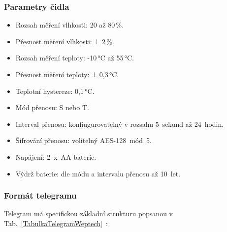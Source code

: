 \subsubsection{Parametry čidla}
\begin{itemize}
	\item Rozsah měření vlhkosti: 20 až 80\,\%.
	\item Přesnost měření vlhkosti: ± 2\,\%.
	\item Rozsah měření teploty: -10\,°C až 55\,°C.
	\item Přesnost měření teploty: ± 0,3\,°C.
	\item Teplotní hystereze: 0,1\,°C.
	\item Mód přenosu: S nebo T.
	\item Interval přenosu: konfiugurovatelný v rozsahu 5~sekund až 24~hodin.
	\item Šifrování přenosu: volitelný AES-128~mód~5.
	\item Napájení: 2~x~AA baterie.
	\item Výdrž baterie: dle módu a intervalu přenosu až 10~let.
\end{itemize}


\subsubsection{Formát telegramu}

Telegram má specifickou základní strukturu popsanou v Tab.~\ref{TabulkaTelegramWeptech}~\cite{CidloWeptech}:

